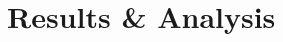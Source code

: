 \documentclass[12pt,letterpaper]{article}
\begin{document}
%
%
%
%
%
%
%
%
%


\section{Results \& Analysis} \label{application}
\end{document}
